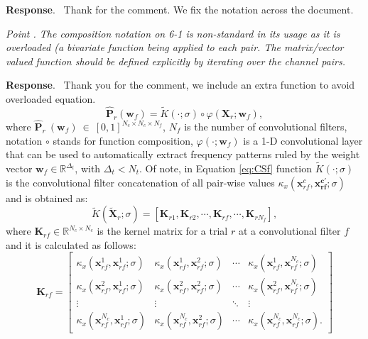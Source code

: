 \documentclass[runningheads]{llncs}
\newcommand{\Real}{\mathbb{R}}
\newcommand{\ve}[1]{\bm {#1}}
\newcommand{\mat}[1]{\bm {#1}}
\newenvironment{reviewer}{\setcounter{pointcounter}{1}}{}
\newcommand{\changes}[1]{\textcolor[rgb]{1.00,0.00,0.00}{#1}}
\newcommand{\point}[1]{\medskip \noindent
 \textsl{{\fontseries{b}\selectfont Point \thepointcounter}.
 \stepcounter{pointcounter} #1}}
\newcommand{\reply}{\medskip \noindent \textbf{Response}.\ }
\begin{document}
\begin{reviewer}
\reply{
    Thank for the comment. We fix the notation across the document.
}

\point{The composition notation on 6-1 is non-standard in its usage as it is overloaded (a bivariate function being applied to each pair. The matrix/vector valued function should be defined explicitly by iterating over the channel pairs. }

\reply{
    Thank you for the comment, we include an extra function to avoid overloaded equation.
    \changes{
        \begin{equation}\label{eq:CSf}
            \hat{\mat{P}}_{r}(\ve{w}_f)  = \tilde{K}(\cdot;\sigma) \circ \varphi(\mat{X}_r; \ve{w}_f), 
        \end{equation}
        where $\hat{\mat{P}}_{r}~(\ve{w}_f)~\in~[0,1]^{N_c\times N_c \times N_f}$, $N_f$ is the number of convolutional filters, notation $\circ$ stands for function composition, $\varphi(\cdot; \mat{w}_f)$ is a 1-D convolutional layer that can be used to automatically extract frequency patterns ruled by the weight vector $\ve{w}_f\in \Real^{\Delta_t}$, with $\Delta_t<N_t.$ Of note, in Equation \eqref{eq:CSf} function $\tilde{K}(\cdot;\sigma)$ is the convolutional filter concatenation of all pair-wise values $\kappa_{x}(\ve{x}^{c}_{rf},\ve{x^{c'}_{rf}}; \sigma)$ and is obtained as:
        \begin{equation}
            \tilde{K}(\mat{\tilde{X}}_r;\sigma) = \left[ \mat{K}_{r1} , \mat{K}_{r2}, \cdots,\mat{K}_{rf},\cdots, \mat{K}_{rN_f} \right],
        \end{equation}
        where $\mat{K}_{rf} \in \Real^{N_c \times N_c}$ is the kernel matrix for a trial $r$ at a convolutional filter $f$ and it is calculated as follows:
        \begin{equation}
            \mat{K}_{rf} = \begin{bmatrix}
                \kappa_{x}(\ve{x}^{1}_{rf}, \ve{x}^{1}_{rf}; \sigma) & \kappa_{x}(\ve{x}^{1}_{rf}, \ve{x}^{2}_{rf}; \sigma) & \cdots & \kappa_{x}(\ve{x}^{1}_{rf}, \ve{x}^{N_c}_{rf}; \sigma) \\
                \kappa_{x}(\ve{x}^{2}_{rf}, \ve{x}^{1}_{rf}; \sigma) & \kappa_{x}(\ve{x}^{2}_{rf}, \ve{x}^{2}_{rf}; \sigma) & \cdots & \kappa_{x}(\ve{x}^{2}_{rf}, \ve{x}^{N_c}_{rf}; \sigma) \\
                \vdots & \vdots & \ddots & \vdots \\
                \kappa_{x}(\ve{x}^{N_c}_{rf}, \ve{x}^{1}_{rf}; \sigma) & \kappa_{x}(\ve{x}^{N_c}_{rf}, \ve{x}^{2}_{rf}; \sigma) & \cdots & \kappa_{x}(\ve{x}^{N_c}_{rf}, \ve{x}^{N_c}_{rf}; \sigma).
            \end{bmatrix}
        \end{equation}
}
}


\end{reviewer}
\end{document}

